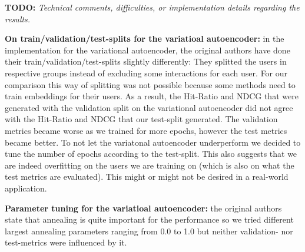 \textbf{TODO: }
\textit{Technical comments, difficulties, or implementation details regarding the results.}

\textbf{On train/validation/test-splits for the variatioal autoencoder:} in the implementation for the variational autoencoder, the original authors have done their train/validation/test-splits slightly differently: They splitted the users in respective groups instead of excluding some interactions for each user. For our comparison this way of splitting was not possible because some methods need to train embeddings for their users. As a result, the Hit-Ratio and NDCG that were generated with the validation split on the variational autoencoder did not agree with the Hit-Ratio and NDCG that our test-split generated. The validation metrics became worse as we trained for more epochs, however the test metrics became better. To not let the variatonal autoencoder underperform we decided to tune the number of epochs according to the test-split. This also suggests that we are indeed overfitting on the users we are training on (which is also on what the test metrics are evaluated). This might or might not be desired in a real-world application.

\textbf{Parameter tuning for the variatioal autoencoder:} the original authors state that annealing is quite important for the performance so we tried different largest annealing parameters ranging from 0.0 to 1.0 but neither validation- nor test-metrics were influenced by it.

